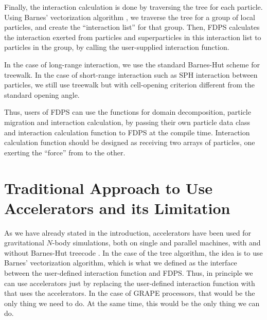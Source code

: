 \documentclass[dvipdfmx]{pasj01}
\begin{document}
Finally, the interaction calculation is done by traversing the tree
for each particle. Using Barnes' vectorization algorithm
\citep{1990JCoPh..87..161B}, we traverse the tree for a group of local
particles, and create the ``interaction list'' for that group. Then,
FDPS calculates the interaction exerted from particles and
superparticles in this interaction list to particles in the group, by
calling the user-supplied interaction function.

In the case of long-range interaction, we use the standard Barnes-Hut
scheme for treewalk. In the case of short-range interaction such as
SPH interaction between particles, we still use treewalk but with
cell-opening criterion different from the standard opening angle.

Thus, users of FDPS can use the functions for domain decomposition,
particle migration and interaction calculation, by passing their own
particle data class and interaction calculation function to FDPS at
the compile time. Interaction calculation function should be designed
as receiving two arrays of particles, one exerting the ``force'' from
to the other.

\section{Traditional Approach to Use Accelerators and its Limitation}

As we have already stated in the introduction, accelerators have been
used for gravitational $N$-body simulations, both on single and
parallel machines, with and without Barnes-Hut treecode
\citep{BarnesHut1986}.  In the case of the tree algorithm, the idea is
to use Barnes' vectorization algorithm, which is what we defined as
the interface between the user-defined interaction function and
FDPS. Thus, in principle we can use accelerators just by replacing the
user-defined interaction function with that uses the accelerators. In
the case of GRAPE processors, that would be the only thing we need to
do. At the same time, this would be the only thing we can do.
\end{document}
